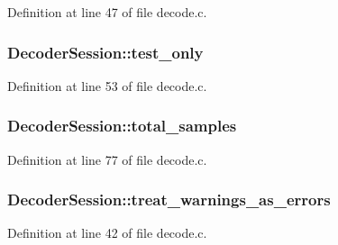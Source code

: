 Definition at line 47 of file decode.\+c.

\subsubsection[{\texorpdfstring{test\+\_\+only}{test_only}}]{ Decoder\+Session\+::test\+\_\+only}\hypertarget{struct_decoder_session_ab3fd442a827a6b06b5006f9bd3a8c668}{}\label{struct_decoder_session_ab3fd442a827a6b06b5006f9bd3a8c668}


Definition at line 53 of file decode.\+c.

\subsubsection[{\texorpdfstring{total\+\_\+samples}{total_samples}}]{ Decoder\+Session\+::total\+\_\+samples}\hypertarget{struct_decoder_session_af94ccd024ddf286bf808930cdde049da}{}\label{struct_decoder_session_af94ccd024ddf286bf808930cdde049da}


Definition at line 77 of file decode.\+c.

\subsubsection[{\texorpdfstring{treat\+\_\+warnings\+\_\+as\+\_\+errors}{treat_warnings_as_errors}}]{ Decoder\+Session\+::treat\+\_\+warnings\+\_\+as\+\_\+errors}\hypertarget{struct_decoder_session_a4ae410f3f0de6ed34b21e9cb517d62f5}{}\label{struct_decoder_session_a4ae410f3f0de6ed34b21e9cb517d62f5}


Definition at line 42 of file decode.\+c.

